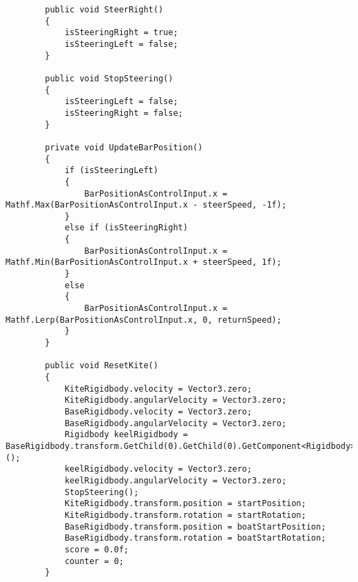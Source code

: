 \begin{lstlisting}
        public void SteerRight()
        {
            isSteeringRight = true;
            isSteeringLeft = false;
        }
    
        public void StopSteering()
        {
            isSteeringLeft = false;
            isSteeringRight = false;
        }
    
        private void UpdateBarPosition()
        {
            if (isSteeringLeft)
            {
                BarPositionAsControlInput.x = Mathf.Max(BarPositionAsControlInput.x - steerSpeed, -1f);
            }
            else if (isSteeringRight)
            {
                BarPositionAsControlInput.x = Mathf.Min(BarPositionAsControlInput.x + steerSpeed, 1f);
            }
            else
            {
                BarPositionAsControlInput.x = Mathf.Lerp(BarPositionAsControlInput.x, 0, returnSpeed);
            }
        }
    
        public void ResetKite()
        {
            KiteRigidbody.velocity = Vector3.zero;
            KiteRigidbody.angularVelocity = Vector3.zero;
            BaseRigidbody.velocity = Vector3.zero;
            BaseRigidbody.angularVelocity = Vector3.zero;
            Rigidbody keelRigidbody = BaseRigidbody.transform.GetChild(0).GetChild(0).GetComponent<Rigidbody>();
            keelRigidbody.velocity = Vector3.zero;
            keelRigidbody.angularVelocity = Vector3.zero;
            StopSteering();
            KiteRigidbody.transform.position = startPosition;
            KiteRigidbody.transform.rotation = startRotation;
            BaseRigidbody.transform.position = boatStartPosition;
            BaseRigidbody.transform.rotation = boatStartRotation;
            score = 0.0f;
            counter = 0;
        }
    

\end{lstlisting}
